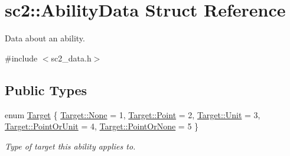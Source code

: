 \hypertarget{structsc2_1_1_ability_data}{}\section{sc2\+:\+:Ability\+Data Struct Reference}
\label{structsc2_1_1_ability_data}


Data about an ability.  




{\ttfamily \#include $<$sc2\+\_\+data.\+h$>$}

\subsection*{Public Types}
\begin{DoxyCompactItemize}
\item 
enum \hyperlink{structsc2_1_1_ability_data_a15aaa20bd058eeb35728e2eeff6518f6}{Target} \{ \newline
\hyperlink{structsc2_1_1_ability_data_a15aaa20bd058eeb35728e2eeff6518f6a6adf97f83acf6453d4a6a4b1070f3754}{Target\+::\+None} = 1, 
\hyperlink{structsc2_1_1_ability_data_a15aaa20bd058eeb35728e2eeff6518f6a2a3cd5946cfd317eb99c3d32e35e2d4c}{Target\+::\+Point} = 2, 
\hyperlink{structsc2_1_1_ability_data_a15aaa20bd058eeb35728e2eeff6518f6a19c562a36aeb455d09534f93b4f5236f}{Target\+::\+Unit} = 3, 
\hyperlink{structsc2_1_1_ability_data_a15aaa20bd058eeb35728e2eeff6518f6a6f98194de114e80cc9a4b2a36f81a073}{Target\+::\+Point\+Or\+Unit} = 4, 
\newline
\hyperlink{structsc2_1_1_ability_data_a15aaa20bd058eeb35728e2eeff6518f6a40d15a87a5c57aab72d805030ad20ce4}{Target\+::\+Point\+Or\+None} = 5
 \}\begin{DoxyCompactList}\small\item\em Type of target this ability applies to. \end{DoxyCompactList}
\end{DoxyCompactItemize}
